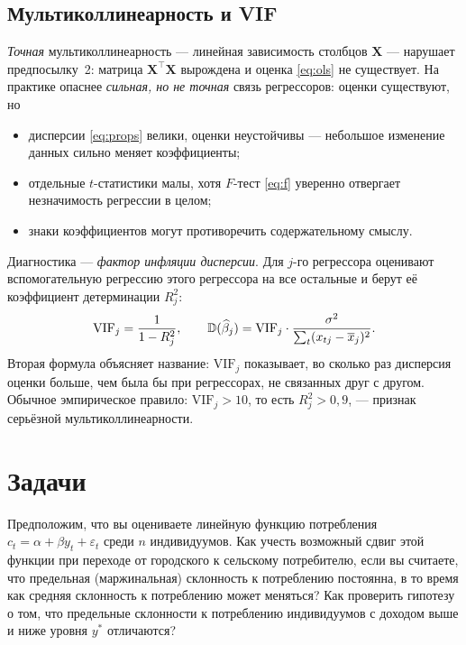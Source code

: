 \subsection{Мультиколлинеарность и VIF}\label{sec:vif}

\emph{Точная} мультиколлинеарность — линейная зависимость столбцов
$\mathbf{X}$ — нарушает предпосылку~2: матрица $\mathbf{X}^{\top}\mathbf{X}$
вырождена и оценка \eqref{eq:ols} не существует. На практике опаснее
\emph{сильная, но не точная} связь регрессоров: оценки существуют, но
\begin{itemize}[leftmargin=2.2em, itemsep=2pt]
  \item дисперсии \eqref{eq:props} велики, оценки неустойчивы — небольшое
        изменение данных сильно меняет коэффициенты;
  \item отдельные $t$-статистики малы, хотя $F$-тест \eqref{eq:f} уверенно
        отвергает незначимость регрессии в целом;
  \item знаки коэффициентов могут противоречить содержательному смыслу.
\end{itemize}
Диагностика — \emph{фактор инфляции дисперсии}. Для $j$-го регрессора оценивают
вспомогательную регрессию этого регрессора на все остальные и берут её
коэффициент детерминации $R_j^2$:
\begin{equation}
  \mathrm{VIF}_j = \frac{1}{1 - R_j^2},
  \qquad
  \mathbb{D}(\widehat{\beta}_j)
  = \mathrm{VIF}_j \cdot \frac{\sigma^2}{\sum_t (x_{tj} - \overline{x}_j)^2} .
  \label{eq:vif}
\end{equation}
Вторая формула объясняет название: $\mathrm{VIF}_j$ показывает, во сколько раз
дисперсия оценки больше, чем была бы при регрессорах, не связанных друг с
другом. Обычное эмпирическое правило: $\mathrm{VIF}_j > 10$, то есть
$R_j^2 > 0{,}9$, — признак серьёзной мультиколлинеарности.
\fi

\section{Задачи}


Предположим, что вы оцениваете линейную функцию потребления
$c_t = \alpha + \beta y_t + \varepsilon_t$ среди $n$ индивидуумов. Как учесть
возможный сдвиг этой функции при переходе от городского к сельскому
потребителю, если вы считаете, что предельная (маржинальная) склонность к
потреблению постоянна, в то время как средняя склонность к потреблению может
меняться? Как проверить гипотезу о том, что предельные склонности к потреблению
индивидуумов с доходом выше и ниже уровня $y^{*}$ отличаются?

